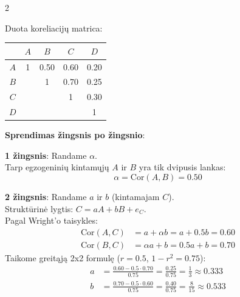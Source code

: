 \documentclass[9pt,a4paper]{article}
\begin{document}
\begin{multicols*}{2}
\begin{center}
{
}%
\end{center}

Duota koreliacijų matrica:
\begin{center}
\begin{tabular}{c|cccc}
 & $A$ & $B$ & $C$ & $D$ \\
\hline
$A$ & 1 & 0.50 & 0.60 & 0.20 \\
$B$ & & 1 & 0.70 & 0.25 \\
$C$ & & & 1 & 0.30 \\
$D$ & & & & 1 \\
\end{tabular}
\end{center}

\textbf{Sprendimas žingsnis po žingsnio}:

\textbf{1 žingsnis}: Randame $\alpha$.\\
Tarp egzogeninių kintamųjų $A$ ir $B$ yra tik dvipusis lankas:
\begin{equation*}
    \alpha = \text{Cor}(A, B) = 0.50
\end{equation*}

\textbf{2 žingsnis}: Randame $a$ ir $b$ (kintamajam $C$).\\
Struktūrinė lygtis: $C = a A + b B + e_C$.\\
Pagal Wright'o taisykles:
\begin{align*}
    \text{Cor}(A, C) &= a + \alpha b = a + 0.5 b = 0.60 \\
    \text{Cor}(B, C) &= \alpha a + b = 0.5 a + b = 0.70
\end{align*}
Taikome greitąją 2x2 formulę ($r = 0.5$, $1 - r^2 = 0.75$):
\begin{align*}
    a &= \frac{0.60 - 0.5 \cdot 0.70}{0.75} = \frac{0.25}{0.75} = \frac{1}{3} \approx 0.333 \\
    b &= \frac{0.70 - 0.5 \cdot 0.60}{0.75} = \frac{0.40}{0.75} = \frac{8}{15} \approx 0.533
\end{align*}


\end{multicols*}
\end{document}
